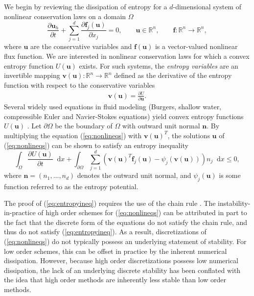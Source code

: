 \documentclass[review]{siamart0216}
\theoremstyle{assumption}
\newcommand{\pd}[2]{\frac{\partial#1}{\partial#2}}
\newcommand{\LRp}[1]{\left( #1 \right)}
\newcommand*\diff[1]{\mathop{}\!{\mathrm{d}#1}}
\begin{document}
We begin by reviewing the dissipation of entropy for a $d$-dimensional system of nonlinear conservation laws on a domain $\Omega$
\begin{equation}
\pd{\bm{u}_h}{t}  + \sum_{j=1}^d\pd{\bm{f}_j(\bm{u})}{x_j} = 0, \qquad \bm{u}\in \mathbb{R}^n, \qquad \bm{f}:\mathbb{R}^n\rightarrow\mathbb{R}^n,
\label{eq:nonlineqs}
\end{equation}
where $\bm{u}$ are the conservative variables and $\bm{f}(\bm{u})$ is a vector-valued nonlinear flux function.  We are interested in nonlinear conservation laws for which a convex entropy function $U(\bm{u})$ exists.  For such systems, the  \emph{entropy variables} are an invertible mapping $\bm{v}(\bm{u}):\mathbb{R}^n\rightarrow \mathbb{R}^n$ defined as the derivative of the entropy function with respect to the conservative variables 
\begin{align}
\bm{v}(\bm{u}) = \pd{U}{\bm{u}}.%
\label{eq:entropyvarsmap}
\end{align}
Several widely used equations in fluid modeling (Burgers, shallow water, compressible Euler and Navier-Stokes equations) yield convex entropy functions $U(\bm{u})$ \cite{hughes1986new, chen2017entropy}.  Let $\partial \Omega$ be the boundary of $\Omega$ with outward unit normal $\bm{n}$.  By multiplying the equation (\ref{eq:nonlineqs}) with $\bm{v}(\bm{u})^T$, the solutions $\bm{u}$ of (\ref{eq:nonlineqs}) can be shown to satisfy an entropy inequality
\begin{equation}
\int_{\Omega}\pd{U(\bm{u})}{t}\diff{x} + \int_{\partial \Omega} \sum_{j=1}^d \LRp{\bm{v}(\bm{u})^T\bm{f}_j(\bm{u}) - \psi_j\LRp{\bm{v}(\bm{u})}}n_j \diff{x} \leq 0, 
\label{eq:entropyineq}
\end{equation}
where $\bm{n} = \LRp{n_1,\ldots,n_d}$ denotes the outward unit normal, and $\psi_j(\bm{u})$ is some function referred to as the entropy potential.  

The proof of (\ref{eq:entropyineq}) requires the use of the chain rule \cite{mock1980systems, harten1983symmetric, dafermos2005compensated}.  The instability-in-practice of high order schemes for (\ref{eq:nonlineqs}) can be attributed in part to the fact that the discrete form of the equations do not satisfy the chain rule, and thus do not satisfy (\ref{eq:entropyineq}).  As a result, discretizations of (\ref{eq:nonlineqs}) do not typically possess an underlying statement of stability.  For low order schemes, this can be offset in practice by the inherent numerical dissipation.  However, because high order discretizations possess low numerical dissipation, the lack of an underlying discrete stability has been conflated with the idea that high order methods are inherently less stable than low order methods.
\end{document}
